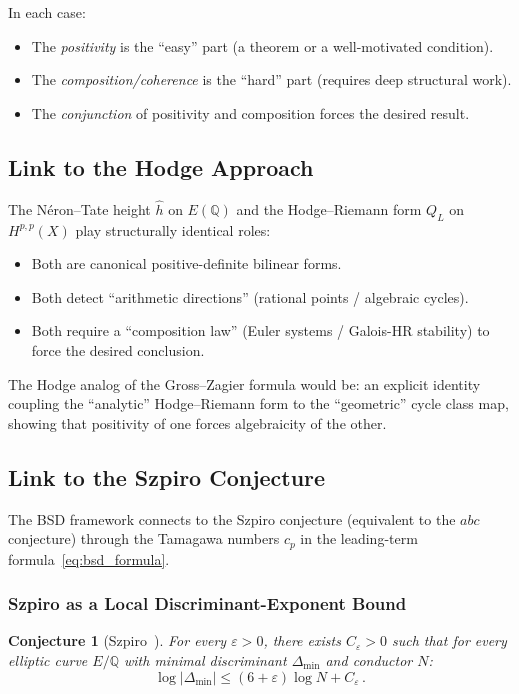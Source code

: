 \documentclass[aps,prd,twocolumn,superscriptaddress,nofootinbib,floatfix]{revtex4-2}
\newtheorem{conjecture}[theorem]{Conjecture}
\theoremstyle{definition}
\theoremstyle{remark}
\begin{document}
In each case:
\begin{itemize}
\item The \textit{positivity} is the ``easy'' part (a theorem or a well-motivated condition).
\item The \textit{composition/coherence} is the ``hard'' part (requires deep structural work).
\item The \textit{conjunction} of positivity and composition forces the desired result.
\end{itemize}

\subsection{Link to the Hodge Approach}

The Néron--Tate height $\hat{h}$ on $E(\mathbb{Q})$ and the Hodge--Riemann form $Q_L$ on $H^{p,p}(X)$ play structurally identical roles:
\begin{itemize}
\item Both are canonical positive-definite bilinear forms.
\item Both detect ``arithmetic directions'' (rational points / algebraic cycles).
\item Both require a ``composition law'' (Euler systems / Galois-HR stability) to force the desired conclusion.
\end{itemize}

The Hodge analog of the Gross--Zagier formula would be: an explicit identity coupling the ``analytic'' Hodge--Riemann form to the ``geometric'' cycle class map, showing that positivity of one forces algebraicity of the other.

\subsection{Link to the Szpiro Conjecture}
\label{sec:szpiro}

The BSD framework connects to the Szpiro conjecture (equivalent to the $abc$ conjecture) through the Tamagawa numbers $c_p$ in the leading-term formula~\eqref{eq:bsd_formula}.

\subsubsection{Szpiro as a Local Discriminant-Exponent Bound}

\begin{conjecture}[Szpiro~\cite{Szpiro1981}]
\label{conj:szpiro}
For every $\varepsilon > 0$, there exists $C_\varepsilon > 0$ such that for every elliptic curve $E/\mathbb{Q}$ with minimal discriminant $\Delta_{\min}$ and conductor $N$:
\begin{equation}
\log|\Delta_{\min}| \leq (6 + \varepsilon) \log N + C_\varepsilon\,.
\label{eq:szpiro}
\end{equation}
\end{conjecture}
\end{document}
